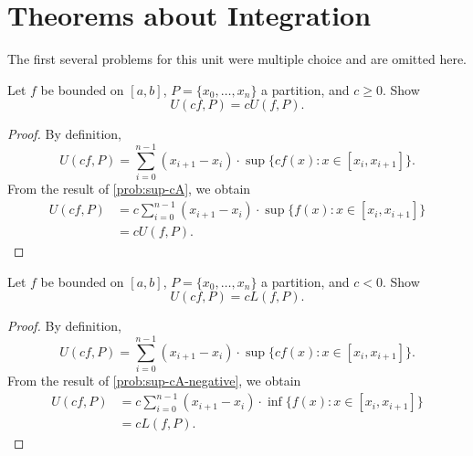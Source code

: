 \section{Theorems about Integration}

\begin{callout}
  The first several problems for this unit were multiple choice
  and are omitted here.
\end{callout}

\begin{problem}
  Let $f$ be bounded on $[a,b]$, $P = \{ x_{0}, \ldots, x_{n} \}$ a partition, and $c \geq 0$. Show
  \[
    U(cf, P) = cU(f, P).
  \]
  
  \begin{proof}
    By definition,
    \[
      U(cf, P) = \sum_{i=0}^{n-1} (x_{i+1} - x_{i}) \cdot \sup \{cf(x) : x \in [x_{i}, x_{i+1}] \}.
    \]
    From the result of \ref{prob:sup-cA}, we obtain
    \begin{align*}
      U(cf, P) &= c \sum_{i=0}^{n-1} (x_{i+1} - x_{i}) \cdot \sup \{f(x) : x \in [x_{i}, x_{i+1}] \}\\
               &= c U(f, P).
    \end{align*}
  \end{proof}

\end{problem}

\begin{problem}
  Let $f$ be bounded on $[a,b]$, $P = \{ x_{0}, \ldots, x_{n} \}$ a partition, and $c < 0$. Show
  \[
    U(cf, P) = cL(f, P).
  \]

  \begin{proof}
    By definition,
    \[
      U(cf, P) = \sum_{i=0}^{n-1} (x_{i+1} - x_{i}) \cdot \sup \{cf(x) : x \in [x_{i}, x_{i+1}] \}.
    \]
    From the result of \ref{prob:sup-cA-negative}, we obtain
    \begin{align*}
      U(cf, P) &= c \sum_{i=0}^{n-1} (x_{i+1} - x_{i}) \cdot \inf \{f(x) : x \in [x_{i}, x_{i+1}] \}\\
               &= c L(f, P).
    \end{align*}
  \end{proof}

\end{problem}


